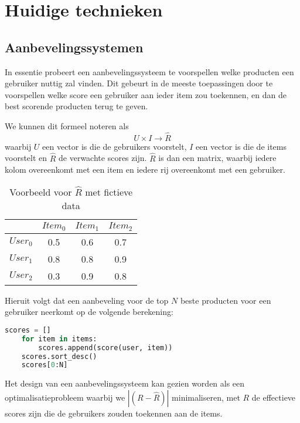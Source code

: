 \chapter{Huidige technieken}
\label{sec:chapt2}
\section{Aanbevelingssystemen}
\label{sec:chapt2_huidige_technieken_aanbevelingssystemen}
In essentie probeert een aanbevelingssysteem te voorspellen welke producten een gebruiker nuttig zal vinden. Dit gebeurt in de meeste toepassingen \cite{overzicht_technieken} door te voorspellen welke score een gebruiker aan ieder item zou toekennen, en dan de best scorende producten terug te geven. 

We kunnen dit formeel noteren als
\begin{equation}
U \times I \rightarrow \hat{R}
\label{def:chap2_aanbevelingssysteem_formeel}    
\end{equation}
waarbij $U$ een vector is die de gebruikers voorstelt, $I$ een vector is die de items voorstelt en $\hat{R}$ de verwachte scores zijn. \cite{cursus_hs2} $\hat{R}$ is dan een matrix, waarbij iedere kolom overeenkomt met een item en iedere rij overeenkomt met een gebruiker.

\begin{table}[H]
\centering
\begin{tabular}{c|ccc}
        & $Item_0$ & $Item_1$ & $Item_2$ \\ \hline
$User_0$ & 0.5     & 0.6     & 0.7     \\
$User_1$ & 0.8     & 0.8     & 0.9     \\
$User_2$ & 0.3     & 0.9     & 0.8    
\end{tabular}
\caption{Voorbeeld voor $\hat{R}$ met fictieve data}
\end{table}

Hieruit volgt dat een aanbeveling voor de top $N$ beste producten voor een gebruiker neerkomt op de volgende berekening:
\begin{lstlisting}[language=python]
    scores = []
    for item in items:
        scores.append(score(user, item))
    scores.sort_desc()
    scores[0:N]
\end{lstlisting}

Het design van een aanbevelingssysteem kan gezien worden als een optimalisatieprobleem waarbij we $|(R - \hat{R})|$ minimaliseren, met $R$ de effectieve scores zijn die de gebruikers zouden toekennen aan de items.

